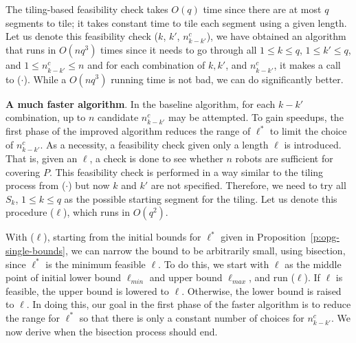 The tiling-based feasibility check takes $O(q)$ time since there are at 
most $q$ segments to tile; it takes constant time to tile each segment 
using a given length. Let us denote this feasibility check 
\isLFeasibleByTilingPartial($k$, $k'$, $n_{k-k'}^c$), we have obtained 
an algorithm that runs in $O(nq^3)$ times since it needs to go through 
all $1 \le k \le q$, $1 \le k' \le q$, and $1 \le n_{k-k'}^c \le n$ and 
for each combination of $k, k'$, and $n_{k-k'}^c$, it makes a call to 
\isLFeasibleByTilingPartial($\cdot$). While a $O(nq^3)$ running time 
is not bad, we can do significantly better. 

\noindent\textbf{A much faster algorithm}.
In the baseline algorithm, for each $k-k'$ combination, up to $n$ 
candidate $n_{k-k'}^c$ may be attempted. To gain speedups, the first 
phase of the improved algorithm reduces the range of $\ell^*$ to limit 
the choice of $n_{k-k'}^c$. As a necessity, a feasibility check given 
only a length $\ell$ is introduced. That is, given an $\ell$, a check
is done to see whether $n$ robots are sufficient for covering $P$. 
This feasibility check is performed in a way similar to the tiling process from 
\isLFeasibleByTilingPartial($\cdot$) but now $k$ and $k'$ are not 
specified. Therefore, we need to try all $S_k$, $1 \le k \le q$ as the 
possible starting segment for the tiling. Let us denote this procedure
\isLFeasibleByTilingFull($\ell$), which runs in $O(q^2)$.

With \isLFeasibleByTilingFull($\ell$), starting from the initial bounds 
for $\ell^*$ given in Proposition~\ref{p:opg-single-bounds}, we can narrow the
bound to be arbitrarily small, using bisection, since $\ell^*$ is the 
minimum feasible $\ell$. To do this, we start with $\ell$ as the middle 
point of initial lower bound $\ell_{min}$ and upper bound $\ell_{max}$, 
and run \isLFeasibleByTilingFull($\ell$). If $\ell$ is feasible, the upper bound 
is lowered to $\ell$. Otherwise, the lower bound is raised to $\ell$. In doing 
this,  our goal in the first phase of the faster
algorithm is to reduce the range for $\ell^*$ so that there is only a 
constant number of choices for $n_{k-k'}^c$. We now derive when the 
bisection process should end. 
\setlength{\abovedisplayskip}{1.6pt}
\setlength{\belowdisplayskip}{2.0pt}

